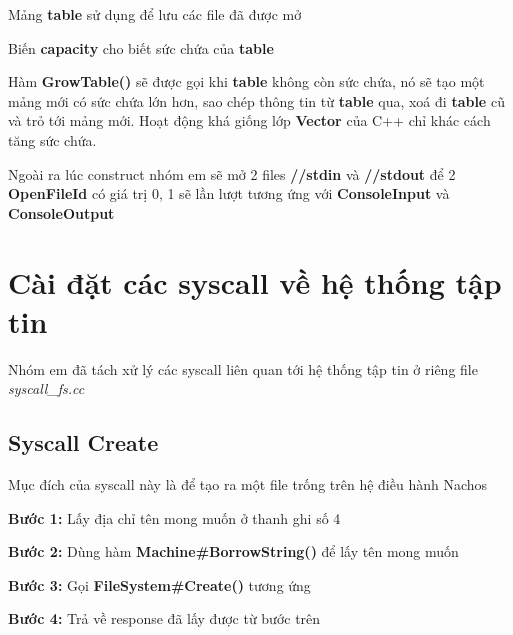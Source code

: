 \vskip 0.5cm

Mảng \textbf{table} sử dụng để lưu các file đã được mở

Biến \textbf{capacity} cho biết sức chứa của \textbf{table}

Hàm \textbf{GrowTable()} sẽ được gọi khi \textbf{table} không còn sức chứa, nó sẽ tạo một mảng mới có sức chứa lớn hơn, sao chép thông tin từ \textbf{table} qua, xoá đi \textbf{table} cũ và trỏ tới mảng mới. Hoạt động khá giống lớp \textbf{Vector} của C++ chỉ khác cách tăng sức chứa.

Ngoài ra lúc construct nhóm em sẽ mở 2 files \textbf{//stdin} và \textbf{//stdout} để 2 \textbf{OpenFileId} có giá trị 0, 1 sẽ lần lượt tương ứng với \textbf{ConsoleInput} và \textbf{ConsoleOutput}

\section{Cài đặt các syscall về hệ thống tập tin}
Nhóm em đã tách xử lý các syscall liên quan tới hệ thống tập tin ở riêng file \textit{syscall\_fs.cc}
\subsection{Syscall Create}
Mục đích của syscall này là để tạo ra một file trống trên hệ điều hành Nachos
\begin{addmargin}[40pt]{0pt}
\textbf{Bước 1: }Lấy địa chỉ tên mong muốn ở thanh ghi số 4
\end{addmargin}
\begin{addmargin}[40pt]{0pt}
\textbf{Bước 2: }Dùng hàm \textbf{Machine\#BorrowString()} để lấy tên mong muốn
\end{addmargin}
\begin{addmargin}[40pt]{0pt}
\textbf{Bước 3: }Gọi \textbf{FileSystem\#Create()} tương ứng
\end{addmargin}
\begin{addmargin}[40pt]{0pt}
\textbf{Bước 4: }Trả về response đã lấy được từ bước trên
\end{addmargin}

